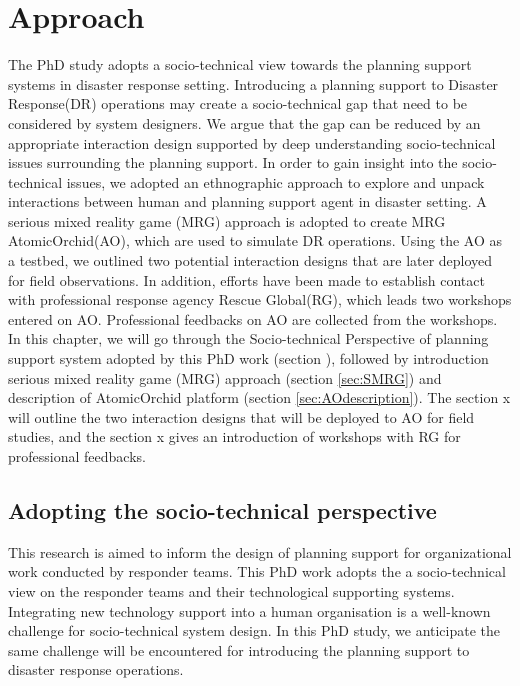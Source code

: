 \chapter{Approach}\label{ch:approach}
The PhD study adopts a socio-technical view towards the planning support systems in disaster response setting. Introducing a planning support to Disaster Response(DR) operations may create a socio-technical gap that need to be considered by system designers. We argue that the gap can be reduced by an appropriate interaction design supported by deep understanding socio-technical issues surrounding the planning support. In order to gain insight into the socio-technical issues, we adopted an ethnographic approach to explore and unpack interactions between human and planning support agent in disaster setting. A serious mixed reality game (MRG) approach is adopted to create MRG AtomicOrchid(AO), which are used to simulate DR operations. Using the AO as a testbed, we outlined two potential interaction designs that are later deployed for field observations. In addition, efforts have been made to establish contact with professional response agency Rescue Global(RG), which leads two workshops entered on AO. Professional feedbacks on AO are collected from the workshops. \\

In this chapter, we will go through the Socio-technical Perspective of planning support system adopted by this PhD work (section ), followed by introduction serious mixed reality game (MRG) approach (section \ref{sec:SMRG}) and description of AtomicOrchid platform (section \ref{sec:AOdescription}). The section x will outline the two interaction designs that will be deployed to AO for field studies, and the section x gives an introduction of workshops with RG for professional feedbacks. \\


\section{Adopting the socio-technical perspective}\label{sec:sociotech}
This research is aimed to inform the design of planning support for organizational work conducted by responder teams. This PhD work adopts the a socio-technical view on the responder teams and their technological supporting systems. Integrating new technology support into a human organisation is a well-known challenge for socio-technical system design. In this PhD study, we anticipate the same challenge will be encountered for  introducing the planning support to disaster response operations.\\

